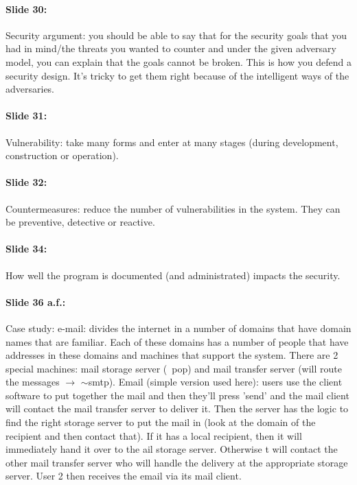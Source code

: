 \documentclass[10pt,a4paper]{report}
\begin{document}
\paragraph{Slide 30:} Security argument: you should be able to say that for the security goals that you had in mind/the threats you wanted to counter and under the given adversary model, you can explain that the goals cannot be broken. This is how you defend a security design. It's tricky to get them right because of the intelligent ways of the adversaries.

\paragraph{Slide 31:} Vulnerability: take many forms and enter at many stages (during development, construction or operation).

\paragraph{Slide 32:} Countermeasures: reduce the number of vulnerabilities in the system. They can be preventive, detective or reactive.

\paragraph{Slide 34:} How well the program is documented (and administrated) impacts the security.

\paragraph{Slide 36 a.f.:} Case study: e-mail: divides the internet in a number of domains that have domain names that are familiar. Each of these domains has a number of people that have addresses in these domains and machines that support the system. There are 2 special machines: mail storage server (~pop) and mail transfer server (will route the messages $\rightarrow$ $\sim$smtp). Email (simple version used here): users use the client software to put together the mail and then they'll press 'send' and the mail client will contact the mail transfer server to deliver it. Then the server has the logic to find the right storage server to put the mail in (look at the domain of the recipient and then contact that). If it has a local recipient, then it will immediately hand it over to the ail storage server. Otherwise t will contact the other mail transfer server who will handle the delivery at the appropriate storage server. User 2 then receives the email via its mail client.\\
\end{document}
